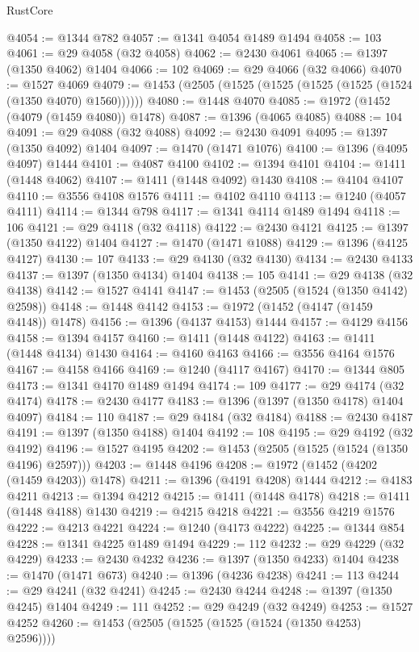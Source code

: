 \begin{lexlean}{RustCore}
\begin{coremodule}
@4054 := @1344 @782
@4057 := @1341 @4054 @1489 @1494
@4058 := 103
@4061 := @29 @4058 (@32 @4058)
@4062 := @2430 @4061
@4065 := @1397 (@1350 @4062) @1404
@4066 := 102
@4069 := @29 @4066 (@32 @4066)
@4070 := @1527 @4069
@4079 := @1453 (@2505 (@1525 (@1525 (@1525 (@1525 (@1524 (@1350 @4070) @1560))))))
@4080 := @1448 @4070
@4085 := @1972 (@1452 (@4079 (@1459 @4080)) @1478)
@4087 := @1396 (@4065 @4085)
@4088 := 104
@4091 := @29 @4088 (@32 @4088)
@4092 := @2430 @4091
@4095 := @1397 (@1350 @4092) @1404
@4097 := @1470 (@1471 @1076)
@4100 := @1396 (@4095 @4097) @1444
@4101 := @4087 @4100
@4102 := @1394 @4101
@4104 := @1411 (@1448 @4062)
@4107 := @1411 (@1448 @4092) @1430
@4108 := @4104 @4107
@4110 := @3556 @4108 @1576
@4111 := @4102 @4110
@4113 := @1240 (@4057 @4111)
@4114 := @1344 @798
@4117 := @1341 @4114 @1489 @1494
@4118 := 106
@4121 := @29 @4118 (@32 @4118)
@4122 := @2430 @4121
@4125 := @1397 (@1350 @4122) @1404
@4127 := @1470 (@1471 @1088)
@4129 := @1396 (@4125 @4127)
@4130 := 107
@4133 := @29 @4130 (@32 @4130)
@4134 := @2430 @4133
@4137 := @1397 (@1350 @4134) @1404
@4138 := 105
@4141 := @29 @4138 (@32 @4138)
@4142 := @1527 @4141
@4147 := @1453 (@2505 (@1524 (@1350 @4142) @2598))
@4148 := @1448 @4142
@4153 := @1972 (@1452 (@4147 (@1459 @4148)) @1478)
@4156 := @1396 (@4137 @4153) @1444
@4157 := @4129 @4156
@4158 := @1394 @4157
@4160 := @1411 (@1448 @4122)
@4163 := @1411 (@1448 @4134) @1430
@4164 := @4160 @4163
@4166 := @3556 @4164 @1576
@4167 := @4158 @4166
@4169 := @1240 (@4117 @4167)
@4170 := @1344 @805
@4173 := @1341 @4170 @1489 @1494
@4174 := 109
@4177 := @29 @4174 (@32 @4174)
@4178 := @2430 @4177
@4183 := @1396 (@1397 (@1350 @4178) @1404 @4097)
@4184 := 110
@4187 := @29 @4184 (@32 @4184)
@4188 := @2430 @4187
@4191 := @1397 (@1350 @4188) @1404
@4192 := 108
@4195 := @29 @4192 (@32 @4192)
@4196 := @1527 @4195
@4202 := @1453 (@2505 (@1525 (@1524 (@1350 @4196) @2597)))
@4203 := @1448 @4196
@4208 := @1972 (@1452 (@4202 (@1459 @4203)) @1478)
@4211 := @1396 (@4191 @4208) @1444
@4212 := @4183 @4211
@4213 := @1394 @4212
@4215 := @1411 (@1448 @4178)
@4218 := @1411 (@1448 @4188) @1430
@4219 := @4215 @4218
@4221 := @3556 @4219 @1576
@4222 := @4213 @4221
@4224 := @1240 (@4173 @4222)
@4225 := @1344 @854
@4228 := @1341 @4225 @1489 @1494
@4229 := 112
@4232 := @29 @4229 (@32 @4229)
@4233 := @2430 @4232
@4236 := @1397 (@1350 @4233) @1404
@4238 := @1470 (@1471 @673)
@4240 := @1396 (@4236 @4238)
@4241 := 113
@4244 := @29 @4241 (@32 @4241)
@4245 := @2430 @4244
@4248 := @1397 (@1350 @4245) @1404
@4249 := 111
@4252 := @29 @4249 (@32 @4249)
@4253 := @1527 @4252
@4260 := @1453 (@2505 (@1525 (@1525 (@1524 (@1350 @4253) @2596))))

\end{coremodule}
\end{lexlean}
